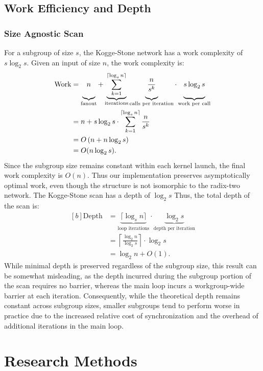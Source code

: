 \documentclass[sigconf]{acmart}
\begin{document}
\subsection{Work Efficiency and Depth}
\subsubsection{Size Agnostic Scan}
For a subgroup of size $s$, the Kogge-Stone network has a work complexity of $s \log_2 s$. Given an input of size $n$, the work complexity is:
\begin{equation}
  \begin{aligned}[b]
    \text{Work} & = \underbrace{\vphantom{\sum_{k=0}^{\lceil \log_s n \rceil}}n}_{\text{fanout}}
    +
    \underbrace{\sum_{k=1}^{\lceil \log_s n \rceil}}_{\text{iterations}}
    \underbrace{\vphantom{\sum_{k=1}^{\lceil \log_s n \rceil}}\frac{n}{s^k}}_{\text{calls per iteration}}
    \cdot
    \underbrace{\vphantom{\sum_{k=1}^{\lceil \log_s n \rceil}}s \log_2 s}_{\text{work per call}} \\
                & = n + s \log_2 s \cdot \sum_{k=1}^{\lceil \log_s n \rceil} \frac{n}{s^k}       \\
                & = O\left(n + n \log_2 s\right)                                                 \\
                & = O(n \log_2 s).
  \end{aligned}
\end{equation}
Since the subgroup size remains constant within each kernel launch, the final work complexity is $O(n)$. Thus our implementation preserves asymptotically optimal work, even though the structure is not isomorphic to the radix-two network. The Kogge-Stone scan has a depth of $\log_2 s$ Thus, the total depth of the scan is:
\begin{equation}
  \begin{aligned}[b]
    \text{Depth} & = \underbrace{\lceil \log_s n \rceil}_{\text{loop iterations}}
    \cdot \underbrace{\log_2 s}_{\text{depth per iteration}}                           \\
                 & = \left\lceil \frac{\log_2 n}{\log_2 s} \right\rceil \cdot \log_2 s \\
                 & = \log_2 n + O(1).
  \end{aligned}
\end{equation}
While minimal depth is preserved regardless of the subgroup size, this result can be somewhat misleading, as the depth incurred during the subgroup portion of the scan requires no barrier, whereas the main loop incurs a workgroup-wide barrier at each iteration. Consequently, while the theoretical depth remains constant across subgroup sizes, smaller subgroups tend to perform worse in practice due to the increased relative cost of synchronization and the overhead of additional iterations in the main loop.
\begin{acks}
\end{acks}




\appendix

\section{Research Methods}
\end{document}
